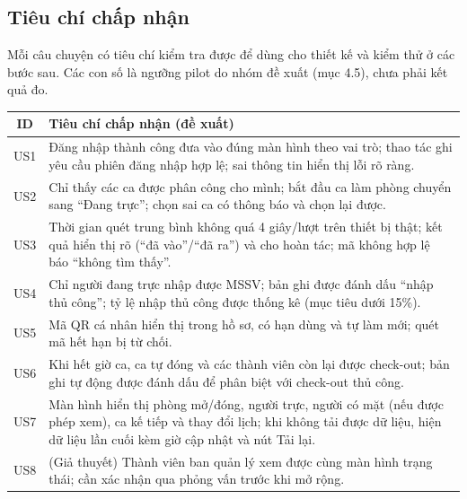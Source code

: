 \subsection{Tiêu chí chấp nhận}
Mỗi câu chuyện có tiêu chí kiểm tra được để dùng cho thiết kế và kiểm thử ở các bước sau. Các con số là ngưỡng pilot do nhóm đề xuất (mục 4.5), chưa phải kết quả đo.
\par
\small
\setlength{\tabcolsep}{1.5pt}
{\centering
\begin{tabularx}{0.95\textwidth}{|c|X|}
\hline
\textbf{ID} & \textbf{Tiêu chí chấp nhận (đề xuất)} \\ \hline
US1 & Đăng nhập thành công đưa vào đúng màn hình theo vai trò; thao tác ghi yêu cầu phiên đăng nhập hợp lệ; sai thông tin hiển thị lỗi rõ ràng. \\ \hline
US2 & Chỉ thấy các ca được phân công cho mình; bắt đầu ca làm phòng chuyển sang ``Đang trực''; chọn sai ca có thông báo và chọn lại được. \\ \hline
US3 & Thời gian quét trung bình không quá 4 giây/lượt trên thiết bị thật; kết quả hiển thị rõ (``đã vào''/``đã ra'') và cho hoàn tác; mã không hợp lệ báo ``không tìm thấy''. \\ \hline
US4 & Chỉ người đang trực nhập được MSSV; bản ghi được đánh dấu ``nhập thủ công''; tỷ lệ nhập thủ công được thống kê (mục tiêu dưới 15\%). \\ \hline
US5 & Mã QR cá nhân hiển thị trong hồ sơ, có hạn dùng và tự làm mới; quét mã hết hạn bị từ chối. \\ \hline
US6 & Khi hết giờ ca, ca tự đóng và các thành viên còn lại được check-out; bản ghi tự động được đánh dấu để phân biệt với check-out thủ công. \\ \hline
US7 & Màn hình hiển thị phòng mở/đóng, người trực, người có mặt (nếu được phép xem), ca kế tiếp và thay đổi lịch; khi không tải được dữ liệu, hiện dữ liệu lần cuối kèm giờ cập nhật và nút Tải lại. \\ \hline
US8 & (Giả thuyết) Thành viên ban quản lý xem được cùng màn hình trạng thái; cần xác nhận qua phỏng vấn trước khi mở rộng. \\ \hline
\end{tabularx}\par}
\normalsize

